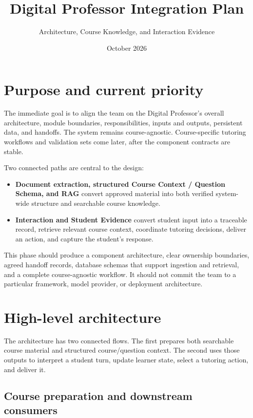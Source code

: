 \documentclass[11pt]{article}
\title{Digital Professor Integration Plan}
\author{Architecture, Course Knowledge, and Interaction Evidence}
\date{October 2026}
\begin{document}
\maketitle
\tableofcontents

\newpage
\section{Purpose and current priority}

The immediate goal is to align the team on the Digital Professor's overall architecture, module boundaries, responsibilities, inputs and outputs, persistent data, and handoffs. The system remains course-agnostic. Course-specific tutoring workflows and validation sets come later, after the component contracts are stable.

Two connected paths are central to the design:

\begin{itemize}
    \item \textbf{Document extraction, structured Course Context / Question Schema, and RAG} convert approved material into both verified system-wide structure and searchable course knowledge.
    \item \textbf{Interaction and Student Evidence} convert student input into a traceable record, retrieve relevant course context, coordinate tutoring decisions, deliver an action, and capture the student's response.
\end{itemize}

This phase should produce a component architecture, clear ownership boundaries, agreed handoff records, database schemas that support ingestion and retrieval, and a complete course-agnostic workflow. It should not commit the team to a particular framework, model provider, or deployment architecture.

\section{High-level architecture}

The architecture has two connected flows. The first prepares both searchable course material and structured course/question context. The second uses those outputs to interpret a student turn, update learner state, select a tutoring action, and deliver it.

\subsection{Course preparation and downstream consumers}
\end{document}
